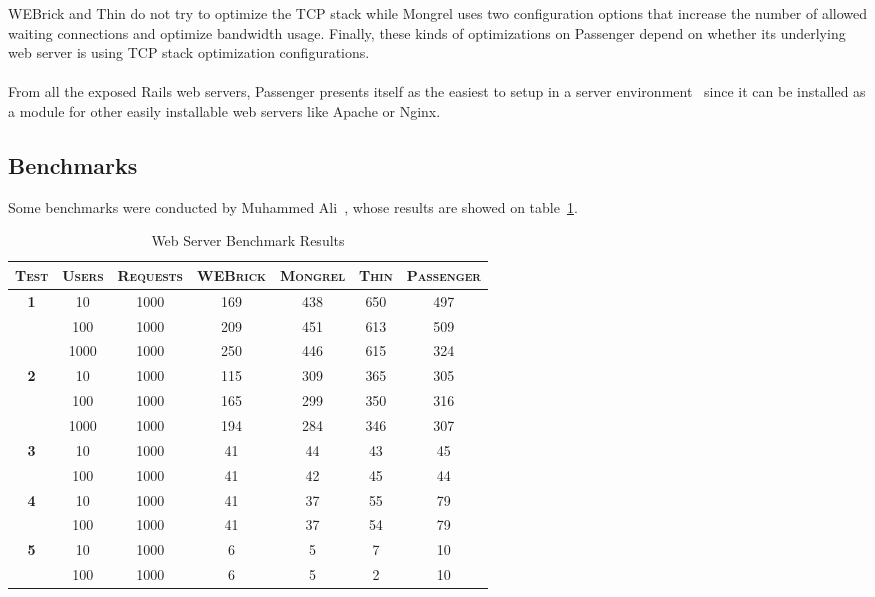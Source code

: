 WEBrick and Thin do not try to optimize the TCP stack while Mongrel uses two configuration options that increase the number of allowed waiting connections and optimize bandwidth usage. Finally, these kinds of optimizations on Passenger depend on whether its underlying web server is using TCP stack optimization configurations.\\\\%
From all the exposed Rails web servers, Passenger presents itself as the easiest to setup in a server environment~\cite{ruby_webservers} since it can be installed as a module for other easily installable web servers like Apache or Nginx.

\subsection{Benchmarks}
Some benchmarks were conducted by Muhammed Ali~\cite{ruby_webservers}, whose results are showed on table~\ref{tab:webserver_benchmarks}.
\begin{table}[h!t]
  \centering
  \caption{Web Server Benchmark Results}
  \label{tab:webserver_benchmarks}
  
  \begin{tabular}{c|c|c|c|c|c|c}
    \textsc{\textbf{Test}} & \textsc{\textbf{Users}} & \textsc{\textbf{Requests}} & \textsc{\textbf{WEBrick}} & \textsc{\textbf{Mongrel}} & \textsc{\textbf{Thin}} & \textsc{\textbf{Passenger}} \\
  \hline

  \multirow{3}{*}{\textbf{1}}
  & 10 & 1000 & 169 & 438 & 650 & 497\\
  & 100 & 1000 & 209 & 451 & 613 & 509\\
  & 1000 & 1000 & 250 & 446 & 615 & 324\\
  \hline
    
  \multirow{3}{*}{\textbf{2}}
  & 10 & 1000 & 115 & 309 & 365 & 305\\
  & 100 & 1000 & 165 & 299 & 350 & 316\\
  & 1000 & 1000 & 194 & 284 & 346 & 307\\
  \hline
  
  \multirow{2}{*}{\textbf{3}}
  & 10 & 1000 & 41 & 44 & 43 & 45\\
  & 100 & 1000 & 41 & 42 & 45 & 44\\
  \hline

  \multirow{2}{*}{\textbf{4}}
  & 10 & 1000 & 41 & 37 & 55 & 79\\
  & 100 & 1000 & 41 & 37 & 54 & 79\\
  \hline
  
  \multirow{2}{*}{\textbf{5}}
  & 10 & 1000 & 6 & 5 & 7 & 10\\
  & 100 & 1000 & 6 & 5 & 2 & 10\\
  
  \end{tabular}
\end{table}

